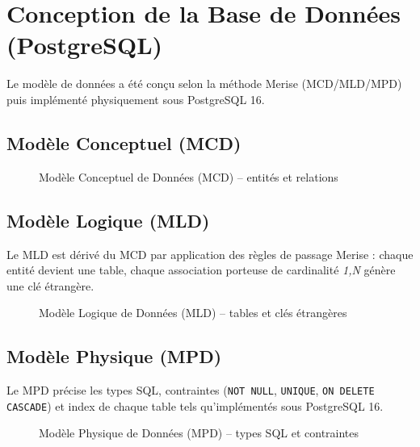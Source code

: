 
\section{Conception de la Base de Données (PostgreSQL)}

Le modèle de données a été conçu selon la méthode Merise (MCD/MLD/MPD) puis implémenté physiquement sous PostgreSQL 16.

\subsection{Modèle Conceptuel (MCD)}

\begin{figure}[H]
    \centering
    \caption{Modèle Conceptuel de Données (MCD) -- entités et relations}
    \label{fig:mcd}
\end{figure}

\subsection{Modèle Logique (MLD)}

Le MLD est dérivé du MCD par application des règles de passage Merise : chaque entité devient une table, chaque association porteuse de cardinalité \textit{1,N} génère une clé étrangère.

\begin{figure}[H]
    \centering
    \caption{Modèle Logique de Données (MLD) -- tables et clés étrangères}
    \label{fig:mld}
\end{figure}

\subsection{Modèle Physique (MPD)}

Le MPD précise les types SQL, contraintes (\texttt{NOT NULL}, \texttt{UNIQUE}, \texttt{ON DELETE CASCADE}) et index de chaque table tels qu'implémentés sous PostgreSQL 16.

\begin{figure}[H]
    \centering
    \caption{Modèle Physique de Données (MPD) -- types SQL et contraintes}
    \label{fig:mpd}
\end{figure}

